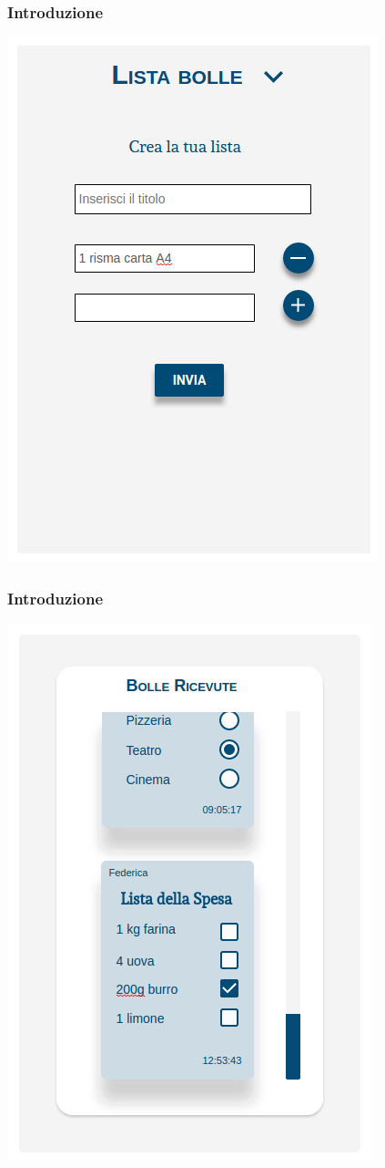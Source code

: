 \begin{frame}
	\frametitle{Introduzione}
	\begin{center}
		\includegraphics[scale=0.35]{img/mockup_3.png}
	\end{center}
	
	
\end{frame}

\begin{frame}
	\frametitle{Introduzione}
	\begin{center}
		\includegraphics[scale=0.35]{img/mockup_4.png}
	\end{center}
	
	
\end{frame}

